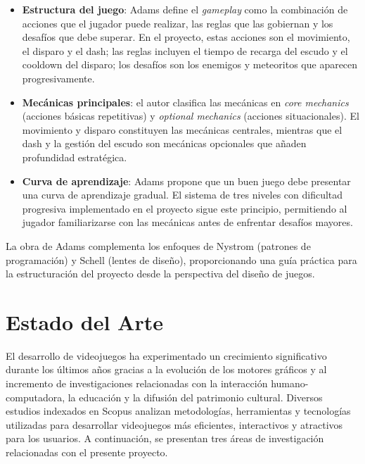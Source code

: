 \documentclass[12pt, a4paper, oneside]{report}
\begin{document}
\begin{itemize}
    \item \textbf{Estructura del juego}: Adams define el \textit{gameplay} como la combinación de acciones que el jugador puede realizar, las reglas que las gobiernan y los desafíos que debe superar. En el proyecto, estas acciones son el movimiento, el disparo y el dash; las reglas incluyen el tiempo de recarga del escudo y el cooldown del disparo; los desafíos son los enemigos y meteoritos que aparecen progresivamente.
    \item \textbf{Mecánicas principales}: el autor clasifica las mecánicas en \textit{core mechanics} (acciones básicas repetitivas) y \textit{optional mechanics} (acciones situacionales). El movimiento y disparo constituyen las mecánicas centrales, mientras que el dash y la gestión del escudo son mecánicas opcionales que añaden profundidad estratégica.
    \item \textbf{Curva de aprendizaje}: Adams propone que un buen juego debe presentar una curva de aprendizaje gradual. El sistema de tres niveles con dificultad progresiva implementado en el proyecto sigue este principio, permitiendo al jugador familiarizarse con las mecánicas antes de enfrentar desafíos mayores.
\end{itemize}

La obra de Adams complementa los enfoques de Nystrom (patrones de programación) y Schell (lentes de diseño), proporcionando una guía práctica para la estructuración del proyecto desde la perspectiva del diseño de juegos.

\newpage

\chapter{Estado del Arte}

El desarrollo de videojuegos ha experimentado un crecimiento significativo durante los últimos años gracias a la evolución de los motores gráficos y al incremento de investigaciones relacionadas con la interacción humano-computadora, la educación y la difusión del patrimonio cultural. Diversos estudios indexados en Scopus analizan metodologías, herramientas y tecnologías utilizadas para desarrollar videojuegos más eficientes, interactivos y atractivos para los usuarios. A continuación, se presentan tres áreas de investigación relacionadas con el presente proyecto.
\end{document}
